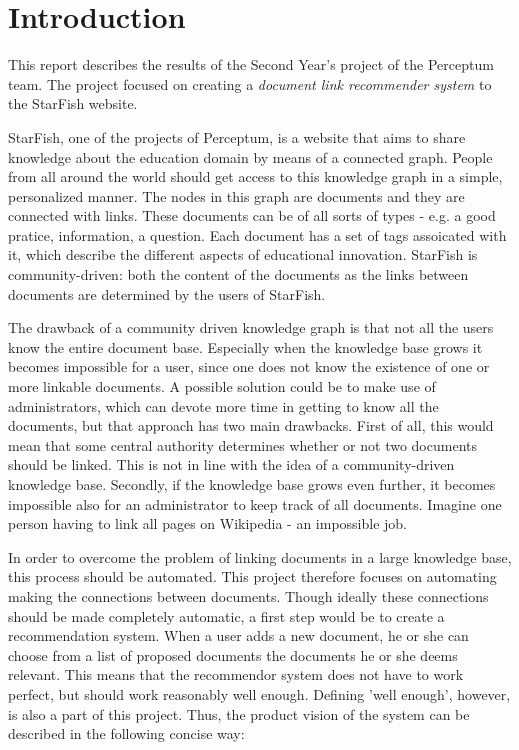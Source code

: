 
\section{Introduction}

This report describes the results of the Second Year's project of the Perceptum team. The project focused on creating a \emph{document link recommender system} to the StarFish website. 

StarFish, one of the projects of Perceptum, is a website that aims to share knowledge about the education domain by means of a connected graph. People from all around the world should get access to this knowledge graph in a simple, personalized manner. The nodes in this graph are documents and they are connected with links. These documents can be of all sorts of types - e.g. a good pratice, information, a question. Each document has a set of tags assoicated with it, which describe the different aspects of educational innovation. StarFish is community-driven: both the content of the documents as the links between documents are determined by the users of StarFish. 

The drawback of a community driven knowledge graph is that not all the users know the entire document base. Especially when the knowledge base grows it becomes impossible for a user, since one does not know the existence of one or more linkable documents. A possible solution could be to make use of administrators, which can devote more time in getting to know all the documents, but that approach has two main drawbacks. First of all, this would mean that some central authority determines whether or not two documents should be linked. This is not in line with the idea of a community-driven knowledge base. Secondly, if the knowledge base grows even further, it becomes impossible also for an administrator to keep track of all documents. Imagine one person having to link all pages on Wikipedia - an impossible job. 

In order to overcome the problem of linking documents in a large knowledge base, this process should be automated. This project therefore focuses on automating making the connections between documents. Though ideally these connections should be made completely automatic, a first step would be to create a recommendation system. When a user adds a new document, he or she can choose from a list of proposed documents the documents he or she deems relevant. This means that the recommendor system does not have to work perfect, but should work reasonably well enough. Defining 'well enough', however, is also a part of this project. Thus, the product vision of the system can be described in the following concise way:

